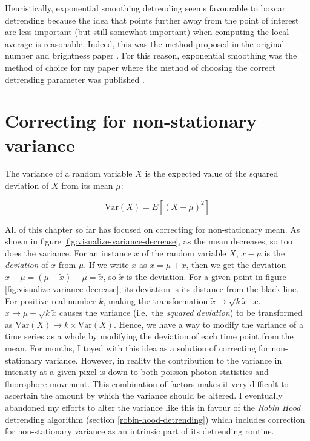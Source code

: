 \documentclass[12pt,]{book}
\theoremstyle{definition}
\theoremstyle{definition}
\theoremstyle{definition}
\theoremstyle{remark}
\let\BeginKnitrBlock\begin \let\EndKnitrBlock\end
\begin{document}
Heuristically, exponential smoothing detrending seems favourable to
boxcar detrending because the idea that points further away from the
point of interest are less important (but still somewhat important) when
computing the local average is reasonable. Indeed, this was the method
proposed in the original number and brightness paper \citep{NB}. For
this reason, exponential smoothing was the method of choice for my paper
where the method of choosing the correct detrending parameter was
published \citep{nandb}.

\section{Correcting for non-stationary
variance}\label{correcting-for-non-stationary-variance}

\BeginKnitrBlock{definition}
\protect\hypertarget{def:unnamed-chunk-24}{}{\label{def:unnamed-chunk-24}
}The variance of a random variable \(X\) is the expected value of the
squared deviation of \(X\) from its mean \(\mu\):

\begin{equation}
\text{Var}(X) = E[(X - \mu)^2]
\label{eq:variance}
\end{equation}
\EndKnitrBlock{definition}

All of this chapter so far has focused on correcting for non-stationary
mean. As shown in figure \ref{fig:visualize-variance-decrease}, as the
mean decreases, so too does the variance. For an instance \(x\) of the
random variable \(X\), \(x - \mu\) is the \emph{deviation} of \(x\) from
\(\mu\). If we write \(x\) as \(x = \mu + \tilde{x}\), then we get the
deviation \(x - \mu = (\mu + \tilde{x}) - \mu = \tilde{x}\), so
\(\tilde{x}\) is the deviation. For a given point in figure
\ref{fig:visualize-variance-decrease}, its deviation is its distance
from the black line. For positive real number \(k\), making the
transformation \(\tilde{x} \rightarrow \sqrt{k}\tilde{x}\) i.e.
\(x \rightarrow \mu + \sqrt{k}\tilde{x}\) causes the variance (i.e.~the
\emph{squared deviation}) to be transformed as
\(\text{Var}(X) \rightarrow k \times \text{Var}(X)\). Hence, we have a
way to modify the variance of a time series as a whole by modifying the
deviation of each time point from the mean. For months, I toyed with
this idea as a solution of correcting for non-stationary variance.
However, in reality the contribution to the variance in intensity at a
given pixel is down to both poisson photon statistics and fluorophore
movement. This combination of factors makes it very difficult to
ascertain the amount by which the variance should be altered. I
eventually abandoned my efforts to alter the variance like this in
favour of the \emph{Robin Hood} detrending algorithm (section
\ref{robin-hood-detrending}) which includes correction for
non-stationary variance as an intrinsic part of its detrending routine.
\end{document}
